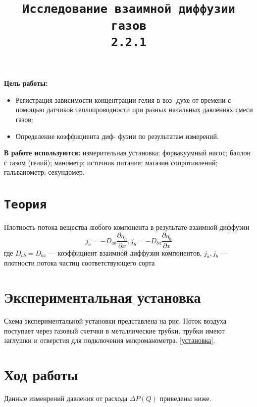 \documentclass[a4paper,12pt]{article} %
\title{\texttt{Исследование взаимной диффузии газов \\ 2.2.1}}
\author{}
\date{}
\begin{document}
  \maketitle

\textbf{Цель работы:} 
\begin{itemize}
  \item  Регистрация зависимости концентрации гелия в воз-
  духе от времени с помощью датчиков теплопроводности при разных
  начальных давлениях смеси газов; 
  \item Определение коэффициента диф-
  фузии по результатам измерений.
\end{itemize}
\textbf{В работе используются:}  измерительная установка; форвакуумный
насос; баллон с газом (гелий); манометр; источник питания; магазин
сопротивлений; гальванометр; секундомер.

\section*{\texttt{Теория}}
Плотность потока вещества любого компонента в результате взаимной диффузии
\begin{equation}
  j_a = -D_{ab}\frac{\partial \eta_a}{\partial x}, 
  j_b = -D_{ba}\frac{\partial \eta_b}{\partial x}
\end{equation}
где $D_{ab} = D_{ba}$ — коэффициент взаимной диффузии компонентов,
$j_a, j_b$ — плотности потока частиц соответствующего сорта
\section*{Экспериментальная установка}
Схема экспериментальной установки представлена на рис. Поток воздуха поступает через газовый счетчки в металлические трубки, трубки имеют заглушки и отверстия для подключения микроманометра.  \ref{установка}. 

\section*{Ход работы}

Данные изменрений давления от расхода $\Delta P (Q)$ приведены ниже. 
\end{document}
